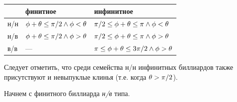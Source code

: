 \documentclass[a4paper]{article}
\begin{document}
\begin{tabular}{|p{1.3in}|p{1.4in}|p{}|} \hline 
 & финитное & инфинитное \\ \hline
н/н & $\phi + \theta \le \pi /{\rm 2}\wedge \phi < \theta $ & $\pi /{\rm 2}\le \phi +\theta \le \pi\wedge  \phi<\theta$ \\ \hline
н/в & $\phi + \theta \le \pi /{\rm 2} \wedge \phi >\theta $ & $\pi /{\rm 2}\le \phi +\theta \le \pi \wedge  \phi >\theta$ \\ \hline 
в/в & --- & $\pi \le \phi +\theta \le 3\pi/{\rm 2} \wedge  \phi >\theta $ \\ \hline
\end{tabular}

Следует отметить, что среди семейства н/н инфинитных биллиардов также присутствуют и невыпуклые клинья (т.е. когда $\theta>\pi/{\rm 2}$).


 Начнем с финитного биллиарда \textit{н/в} типа.
\end{document}
